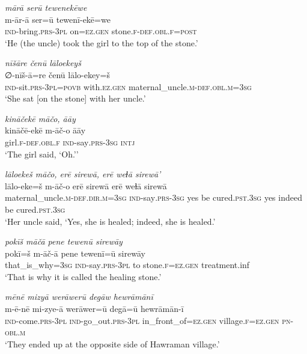 \ea \label{ZP.55}
\textit{mārā serū tewenekēwe} \\ 
\gll m-ār-ā ser=ū tewenī-ekē=we \\ 
 \textsc{ind-}bring\textsc{.prs}\textsc{-3pl} on\textsc{\textsc{=ez.gen}} stone\textsc{.f}\textsc{-def}\textsc{.obl}\textsc{.f}\textsc{=\textsc{post}} \\ 
\glt `He (the uncle) took the girl to the top of the stone.'
\z 
 
\ea \label{ZP.56}
\textit{nīšāre čenū lāloekeyš} \\ 
\gll ∅-nīš-ā=re čenū lālo-ekey=š \\ 
 \textsc{ind-}sit\textsc{.prs}\textsc{-3pl}\textsc{=\textsc{povb}} with\textsc{.ez.gen} maternal\_uncle\textsc{.m}\textsc{-def}\textsc{.obl}\textsc{.m}\textsc{=3sg} \\ 
\glt `She sat [on the stone] with her uncle.'
\z 
 
\ea \label{ZP.57}
\textit{kināčekē māčo, āāy} \\ 
\gll kināčē-ekē m-āč-o āāy \\ 
 girl\textsc{.f}\textsc{-def}\textsc{.obl}\textsc{.f} \textsc{ind-}say\textsc{.prs}\textsc{-3sg} \textsc{intj} \\ 
\glt `The girl said, ‘Oh.’'
\z 
 
\ea \label{ZP.58}
\textit{lāloekeš māčo, erē sirewā, erē weɫā sirewā’} \\ 
\gll lālo-eke=š m-āč-o erē sirewā erē weɫā sirewā \\ 
 maternal\_uncle\textsc{.m}\textsc{-def}\textsc{.dir}\textsc{.m}\textsc{=3sg} \textsc{ind-}say\textsc{.prs}\textsc{-3sg} yes be cured\textsc{.pst}\textsc{.3sg} yes indeed be cured\textsc{.pst}\textsc{.3sg} \\ 
\glt `Her uncle said, ‘Yes, she is healed; indeed, she is healed.'
\z 
 
\ea \label{ZP.59}
\textit{pokīš māčā pene tewenū sirewāy} \\ 
\gll pokī=š m-āč-ā pene tewenī=ū sirewāy \\ 
 that\_is\_why\textsc{=3sg} \textsc{ind-}say\textsc{.prs}\textsc{-3pl} to stone\textsc{.f}\textsc{\textsc{=ez.gen}} treatment.inf \\ 
\glt `That is why it is called the healing stone.'
\z 
 
\ea \label{ZP.62}
\textit{mēnē mizyā werāwerū degāw hewrāmānī} \\ 
\gll m-ē-nē mi-zye-ā werāwer=ū degā=ū hewrāmān-ī \\ 
 \textsc{ind-}come\textsc{.prs}\textsc{-3pl} \textsc{ind-}go\_out\textsc{.prs}\textsc{-3pl} in\_front\_of\textsc{\textsc{=ez.gen}} village\textsc{.f}\textsc{\textsc{=ez.gen}} \textsc{pn}\textsc{-obl}\textsc{.m} \\ 
\glt `They ended up at the opposite side of Hawraman village.'
\z 
 
